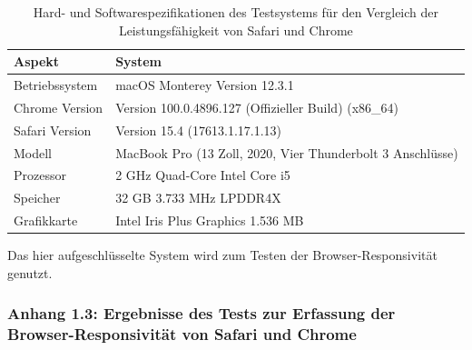 \documentclass[a4paper]{scrartcl}
\begin{document}
\begin{table}[H]
	\centering
	\caption{Hard- und Softwarespezifikationen des Testsystems für den Vergleich der Leistungsfähigkeit von Safari und Chrome}
	\begin{center}
		\begin{tabularx}{\linewidth}{| l | X |}
			\hline
			Aspekt & System \\ 
			\hline \hline
			Betriebssystem & macOS Monterey Version 12.3.1 \\
			\hline
			Chrome Version & Version 100.0.4896.127 (Offizieller Build) (x86\_64) \\
			\hline
			Safari Version & Version 15.4 (17613.1.17.1.13) \\
			\hline
			Modell & MacBook Pro (13 Zoll, 2020, Vier Thunderbolt 3 Anschlüsse) \\
			\hline
			Prozessor & 2 GHz Quad-Core Intel Core i5 \\
			\hline
			Speicher & 32 GB 3.733 MHz LPDDR4X \\
			\hline
			Grafikkarte & Intel Iris Plus Graphics 1.536 MB \\
			\hline
		\end{tabularx}
	\end{center}
	\justifying
	\small	
	Das hier aufgeschlüsselte System wird zum Testen der Browser-Responsivität genutzt.
\end{table}

\newpage

\subsubsection*{Anhang 1.3: Ergebnisse des Tests zur Erfassung der Browser-Responsivität von Safari und Chrome}
\end{document}
